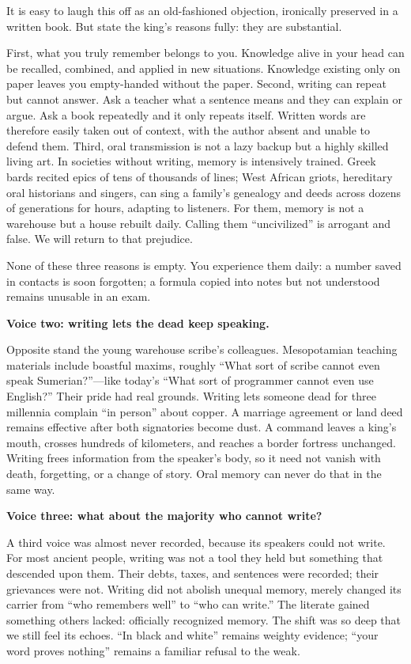 It is easy to laugh this off as an old-fashioned objection, ironically preserved in a written book. But state the king's reasons fully: they are substantial.

First, what you truly remember belongs to you. Knowledge alive in your head can be recalled, combined, and applied in new situations. Knowledge existing only on paper leaves you empty-handed without the paper. Second, writing can repeat but cannot answer. Ask a teacher what a sentence means and they can explain or argue. Ask a book repeatedly and it only repeats itself. Written words are therefore easily taken out of context, with the author absent and unable to defend them. Third, oral transmission is not a lazy backup but a highly skilled living art. In societies without writing, memory is intensively trained. Greek bards recited epics of tens of thousands of lines; West African griots, hereditary oral historians and singers, can sing a family's genealogy and deeds across dozens of generations for hours, adapting to listeners. For them, memory is not a warehouse but a house rebuilt daily. Calling them ``uncivilized'' is arrogant and false. We will return to that prejudice.

None of these three reasons is empty. You experience them daily: a number saved in contacts is soon forgotten; a formula copied into notes but not understood remains unusable in an exam.

\textbf{Voice two: writing lets the dead keep speaking.}

Opposite stand the young warehouse scribe's colleagues. Mesopotamian teaching materials include boastful maxims, roughly ``What sort of scribe cannot even speak Sumerian?''---like today's ``What sort of programmer cannot even use English?'' Their pride had real grounds. Writing lets someone dead for three millennia complain ``in person'' about copper. A marriage agreement or land deed remains effective after both signatories become dust. A command leaves a king's mouth, crosses hundreds of kilometers, and reaches a border fortress unchanged. Writing frees information from the speaker's body, so it need not vanish with death, forgetting, or a change of story. Oral memory can never do that in the same way.

\textbf{Voice three: what about the majority who cannot write?}

A third voice was almost never recorded, because its speakers could not write. For most ancient people, writing was not a tool they held but something that descended upon them. Their debts, taxes, and sentences were recorded; their grievances were not. Writing did not abolish unequal memory, merely changed its carrier from ``who remembers well'' to ``who can write.'' The literate gained something others lacked: officially recognized memory. The shift was so deep that we still feel its echoes. ``In black and white'' remains weighty evidence; ``your word proves nothing'' remains a familiar refusal to the weak.

